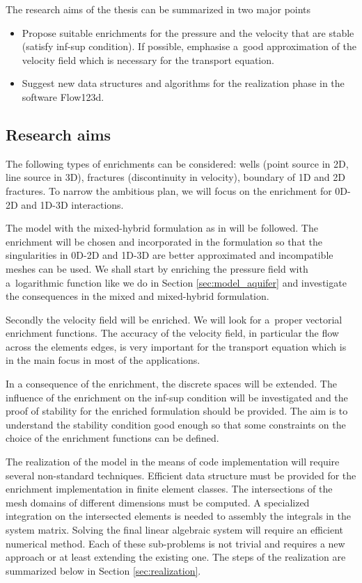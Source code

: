 \documentclass[bibliography=totocnumbered,dvipsnames,FM,Dis]{tulthesis}
\begin{document}
The research aims of the thesis can be summarized in two major points
\begin{itemize}
  \item Propose suitable enrichments for the pressure and the velocity that are stable (satisfy inf-sup condition). 
        If possible, emphasise a~good approximation of the velocity field which is necessary for the transport equation.
        
  \item Suggest new data structures and algorithms for the realization phase in the software Flow123d. 
\end{itemize}

\subsection{Research aims}

The following types of enrichments can be considered: wells (point source in 2D, line source in 3D), 
fractures (discontinuity in velocity), boundary of 1D and 2D fractures. 
To narrow the ambitious plan, we will focus on the enrichment for 0D-2D and 1D-3D interactions.

The model with the mixed-hybrid formulation as in \cite{brezina_mixed-hybrid_2010, sistek_bddc_2015} will be followed.
The enrichment will be chosen and incorporated in the formulation so that the singularities in 0D-2D and
1D-3D are better approximated and incompatible meshes can be used. 
We shall start by enriching the pressure field with a~logarithmic function like we
do in Section \ref{sec:model_aquifer} and investigate the consequences in the mixed and mixed-hybrid formulation.

Secondly the velocity field will be enriched. We will look for a~proper vectorial enrichment functions.
The accuracy of the velocity field, in particular the flow across the elements edges, is very important for
the transport equation which is in the main focus in most of the applications.

In a consequence of the enrichment, the discrete spaces will be extended. The influence of the enrichment on the inf-sup 
condition will be investigated and the proof of stability for the enriched formulation should be provided.
The aim is to understand the stability condition good enough so that some constraints on the choice of the enrichment 
functions can be defined. 

The realization of the model in the means of code implementation will require several non-standard techniques.
Efficient data structure must be provided for the enrichment implementation in finite element classes.
The intersections of the mesh domains of different dimensions must be computed. A specialized integration
on the intersected elements is needed to assembly the integrals in the system matrix. 
Solving the final linear algebraic system will require an efficient numerical method.
Each of these sub-problems is not trivial and requires a new approach or at least extending the existing one.
The steps of the realization are summarized below in Section \ref{sec:realization}.
\end{document}

